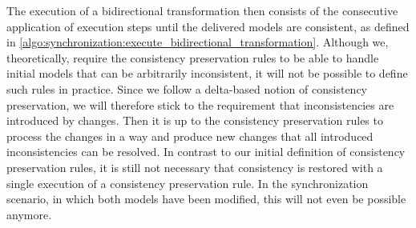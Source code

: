 The execution of a bidirectional transformation then consists of the consecutive application of execution steps until the delivered models are consistent, as defined in \autoref{algo:synchronization:execute_bidirectional_transformation}.
Although we, theoretically, require the consistency preservation rules to be able to handle initial models that can be arbitrarily inconsistent, it will not be possible to define such rules in practice.
Since we follow a delta-based notion of consistency preservation, we will therefore stick to the requirement that inconsistencies are introduced by changes.
Then it is up to the consistency preservation rules to process the changes in a way and produce new changes that all introduced inconsistencies can be resolved.
In contrast to our initial definition of consistency preservation rules, it is still not necessary that consistency is restored with a single execution of a consistency preservation rule.
In the synchronization scenario, in which both models have been modified, this will not even be possible anymore.
